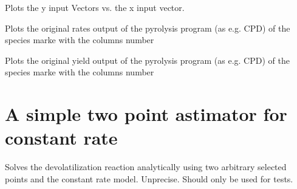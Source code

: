 \documentclass[letterpaper,10pt,english]{sphinxmanual}
\begin{document}
\begin{fulllineitems}

\begin{fulllineitems}
\label{FittingClasses:Fit_one_run.Fit_one_run.plt_InputVectors}
Plots the y input Vectors vs. the x input vector.

\end{fulllineitems}


\begin{fulllineitems}
\label{FittingClasses:Fit_one_run.Fit_one_run.plt_RateVsTime}
Plots the original rates output of the pyrolysis program (as e.g. CPD) of the species marke with the columns number

\end{fulllineitems}


\begin{fulllineitems}
\label{FittingClasses:Fit_one_run.Fit_one_run.plt_YieldVsTime}
Plots the original yield output of the pyrolysis program (as e.g. CPD) of the species marke with the columns number

\end{fulllineitems}


\end{fulllineitems}



\section{A simple two point astimator for constant rate}
\label{FittingClasses:a-simple-two-point-astimator-for-constant-rate}

\begin{fulllineitems}
\label{FittingClasses:Fit_one_run.TwoPointEstimator}
Solves the devolatilization reaction analytically using two arbitrary selected points and the constant rate model. Unprecise. Should only be used for tests.

\end{fulllineitems}
\end{document}
